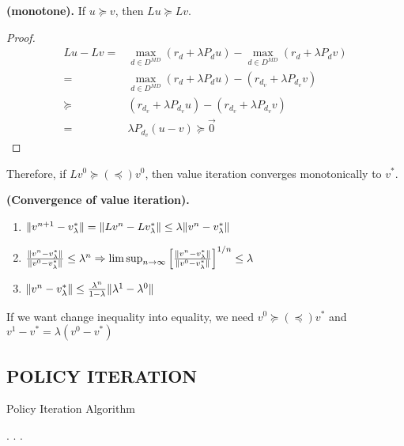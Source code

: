 \begin{theorem}
    \textbf{(monotone).}
    If $ u \succeq v$, then $ Lu \succeq Lv $.
    \begin{proof}
        \begin{align*}
            Lu - Lv =& \max_{d \in D^{MD}} (r_d + \lambda P_{d} u) - \max_{d \in D^{MD}} (r_d + \lambda P_{d} v)\\
            =& \max_{d \in D^{MD}} (r_d + \lambda P_{d} u) - (r_{d_{v}} + \lambda P_{d_{v}} v)\\
            \succeq& (r_{d_{v}}+ \lambda P_{d_{v}} u) - (r_{d_{v}} + \lambda P_{d_{v}} v)\\
            =& \lambda P _{d_{v}} (u - v) \succeq \vec{0}
        \end{align*}
    \end{proof}
\end{theorem}

Therefore, if $ Lv^0 \succeq(\preceq) v^0 $, then value iteration converges monotonically to $ v^* $.

\begin{theorem}
    \textbf{(Convergence of value iteration).}
    \begin{enumerate}
        \item $ \Arrowvert v^{n+1} - v^*_\lambda \Arrowvert = \Arrowvert Lv^n - Lv^*_\lambda \Arrowvert \le \lambda \Arrowvert v^n - v^*_\lambda \Arrowvert $
    \item $ \frac{\Arrowvert v^{n} - v^*_\lambda \Arrowvert}{\Arrowvert v^0 - v^*_\lambda \Arrowvert} \le \lambda^{n} \Rightarrow \limsup_{n \rightarrow\infty} {\left[ \frac{\Arrowvert v^{n} - v^*_\lambda \Arrowvert}{\Arrowvert v^0 - v^*_\lambda \Arrowvert}\right]}^{1/n} \le \lambda$ 
        \item $ \Arrowvert v^n - v^*_{\lambda} \Arrowvert \le \frac{\lambda^n}{1-\lambda} \Arrowvert \lambda^1 - \lambda^0 \Arrowvert$
    \end{enumerate}
    If we want change inequality into equality, we need $ v^0 \succeq(\preceq) v^* $ and $ v^1 - v^* = \lambda(v^0 - v^*) $
\end{theorem}

\subsection{POLICY ITERATION}%
\label{sub:policy_iteration}

\begin{algorithm}[h!]
    \caption{Policy Iteration Algorithm}
    \begin{algorithmic}
        .
            \EndIf.
        \EndFor.
    \end{algorithmic}
\end{algorithm}

